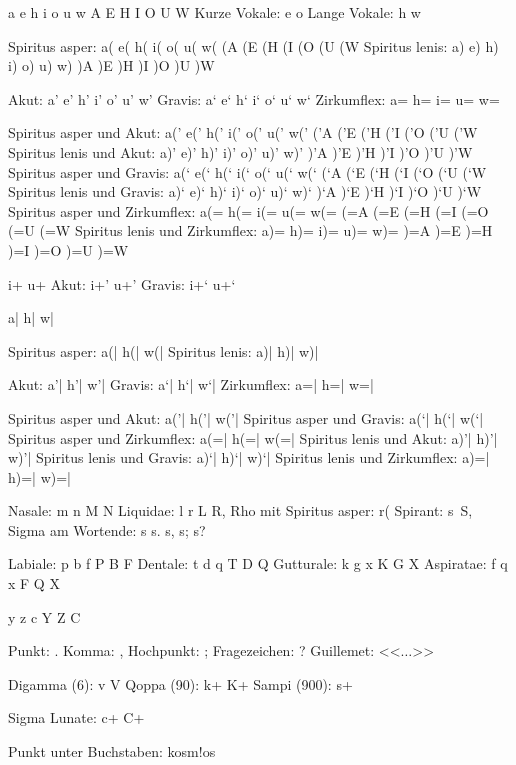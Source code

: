 
\obeylines
{}
\GK a e h i o u w A E H I O U W\RM
Kurze Vokale: \GK e o\RM
Lange Vokale: \GK h w\RM

\medskip {}
Spiritus asper: \GK a( e( h( i( o( u( w( (A (E (H (I (O (U (W \RM
Spiritus lenis: \GK a) e) h) i) o) u) w) )A )E )H )I )O )U )W \RM

\medskip {}
Akut: \GK a' e' h' i' o' u' w'\RM
Gravis: \GK a` e` h` i` o` u` w` \RM
Zirkumflex: \GK a= h= i= u= w= \RM

\medskip {}
Spiritus asper und Akut: \GK a(' e(' h(' i(' o(' u(' w(' %
 ('A ('E ('H ('I ('O ('U ('W\RM
Spiritus lenis und Akut: \GK a)' e)' h)' i)' o)' u)' w)' %
 )'A )'E )'H )'I )'O )'U )'W\RM
Spiritus asper und Gravis: \GK a(` e(` h(` i(` o(` u(` w(` %
 (`A (`E (`H (`I (`O (`U (`W\RM
Spiritus lenis und Gravis: \GK a)` e)` h)` i)` o)` u)` w)` %
 )`A )`E )`H )`I )`O )`U )`W\RM
Spiritus asper und Zirkumflex: \GK a(= h(= i(= u(= w(= %
 (=A (=E (=H (=I (=O (=U (=W\RM
Spiritus lenis und Zirkumflex: \GK a)= h)= i)= u)= w)= %
 )=A )=E )=H )=I )=O )=U )=W\RM

\medskip {}
\GK i+ u+\RM
\medskip {}
Akut: \GK i+' u+'\RM
Gravis: \GK i+` u+`\RM

\medskip {}
\GK a| h| w|\RM

\medskip {}
Spiritus asper: \GK a(| h(| w(|\RM
Spiritus lenis: \GK a)| h)| w)|\RM

\medskip {}
Akut: \GK a'| h'| w'|\RM
Gravis: \GK a`| h`| w`|\RM
Zirkumflex: \GK a=| h=| w=|\RM

\medskip {}
Spiritus asper und Akut: \GK a('| h('| w('|\RM
Spiritus asper und Gravis: \GK a(`| h(`| w(`|\RM
Spiritus asper und Zirkumflex: \GK a(=| h(=| w(=|\RM
Spiritus lenis und Akut: \GK a)'| h)'| w)'|\RM
Spiritus lenis und Gravis: \GK a)`| h)`| w)`|\RM
Spiritus lenis und Zirkumflex: \GK a)=| h)=| w)=|\RM

\medskip{}
Nasale: \GK m n M N\RM
Liquidae: \GK l r L R\RM, Rho mit Spiritus asper: \GK r(\RM
Spirant: \GK s\noboundary\ S\RM, Sigma am Wortende: \GK s s. s, s; s?\RM

\filbreak{}
Labiale: \GK p b f P B F \RM
Dentale: \GK t d q T D Q\RM
Gutturale: \GK k g x K G X\RM
Aspiratae: \GK f q x F Q X\RM

\medskip{}
\GK y z c Y Z C\RM

\medskip {}
Punkt: \GK.\RM
Komma: \GK,\RM
Hochpunkt: \GK;\RM
Fragezeichen: \GK?\RM
Guillemet: \GK<<$\ldots$>>\RM

\medskip {}
Digamma (6): \GK v V \RM
Qoppa (90): \GK k+ K+ \RM
Sampi (900): \GK s+\RM

\medskip {}
Sigma Lunate: \GK c+ C+\RM

Punkt unter Buchstaben: \GK kosm!os\RM


\bye
